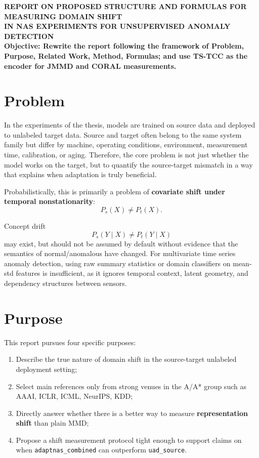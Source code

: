 \documentclass[a4paper]{article}
\begin{document}
\begin{center}
    \textbf{\Large REPORT ON PROPOSED STRUCTURE AND FORMULAS FOR MEASURING DOMAIN SHIFT}\\[0.2cm]
    \textbf{\Large IN NAS EXPERIMENTS FOR UNSUPERVISED ANOMALY DETECTION}\\[0.5cm]
    \textbf{Objective: Rewrite the report following the framework of Problem, Purpose, Related Work, Method, Formulas; and use TS-TCC as the encoder for JMMD and CORAL measurements.}
\end{center}

\section{Problem}

In the experiments of the thesis, models are trained on source data and deployed to unlabeled target data. Source and target often belong to the same system family but differ by machine, operating conditions, environment, measurement time, calibration, or aging. Therefore, the core problem is not just whether the model works on the target, but to quantify the source-target mismatch in a way that explains when adaptation is truly beneficial.

Probabilistically, this is primarily a problem of \textbf{covariate shift under temporal nonstationarity}:
\[
P_s(X) \neq P_t(X).
\]

Concept drift
\[
P_s(Y \mid X) \neq P_t(Y \mid X)
\]
may exist, but should not be assumed by default without evidence that the semantics of normal/anomalous have changed. For multivariate time series anomaly detection, using raw summary statistics or domain classifiers on mean-std features is insufficient, as it ignores temporal context, latent geometry, and dependency structures between sensors.

\section{Purpose}

This report pursues four specific purposes:
\begin{enumerate}[label=\arabic*.]
    \item Describe the true nature of domain shift in the source-target unlabeled deployment setting;
    \item Select main references only from strong venues in the A/A* group such as AAAI, ICLR, ICML, NeurIPS, KDD;
    \item Directly answer whether there is a better way to measure \textbf{representation shift} than plain MMD;
    \item Propose a shift measurement protocol tight enough to support claims on when \texttt{adaptnas\_combined} can outperform \texttt{uad\_source}.
\end{enumerate}
\end{document}
